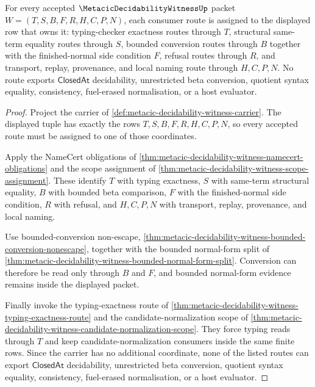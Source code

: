 \begin{theorem}
\label{thm:metacic-decidability-witness-scope-routes}
For every accepted $\MetacicDecidabilityWitnessUp$ packet $W=(T,S,B,F,R,H,C,P,N)$, each consumer route is assigned to the displayed row that owns it: typing-checker exactness routes through $T$, structural same-term equality routes through $S$, bounded conversion routes through $B$ together with the finished-normal side condition $F$, refusal routes through $R$, and transport, replay, provenance, and local naming route through $H,C,P,N$. No route exports $\mathsf{ClosedAt}$ decidability, unrestricted beta conversion, quotient syntax equality, consistency, fuel-erased normalisation, or a host evaluator.
\end{theorem}
\begin{proof}
Project the carrier of \autoref{def:metacic-decidability-witness-carrier}. The displayed tuple has exactly the rows $T,S,B,F,R,H,C,P,N$, so every accepted route must be assigned to one of those coordinates.

Apply the NameCert obligations of \autoref{thm:metacic-decidability-witness-namecert-obligations} and the scope assignment of \autoref{thm:metacic-decidability-witness-scope-assignment}. These identify $T$ with typing exactness, $S$ with same-term structural equality, $B$ with bounded beta comparison, $F$ with the finished-normal side condition, $R$ with refusal, and $H,C,P,N$ with transport, replay, provenance, and local naming.

Use bounded-conversion non-escape, \autoref{thm:metacic-decidability-witness-bounded-conversion-nonescape}, together with the bounded normal-form split of \autoref{thm:metacic-decidability-witness-bounded-normal-form-split}. Conversion can therefore be read only through $B$ and $F$, and bounded normal-form evidence remains inside the displayed packet.

Finally invoke the typing-exactness route of \autoref{thm:metacic-decidability-witness-typing-exactness-route} and the candidate-normalization scope of \autoref{thm:metacic-decidability-witness-candidate-normalization-scope}. They force typing reads through $T$ and keep candidate-normalization consumers inside the same finite rows. Since the carrier has no additional coordinate, none of the listed routes can export $\mathsf{ClosedAt}$ decidability, unrestricted beta conversion, quotient syntax equality, consistency, fuel-erased normalisation, or a host evaluator.
\end{proof}

